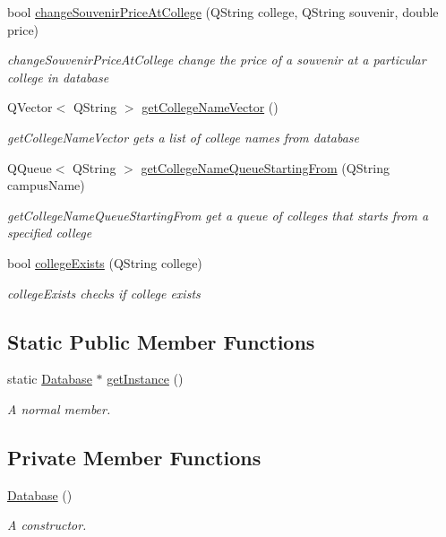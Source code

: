 \begin{DoxyCompactItemize}
bool \hyperlink{class_database_acf6e65da15d6219c2de6d8f5515cb6da}{change\+Souvenir\+Price\+At\+College} (Q\+String college, Q\+String souvenir, double price)
\begin{DoxyCompactList}\small\item\em change\+Souvenir\+Price\+At\+College change the price of a souvenir at a particular college in database \end{DoxyCompactList}\item 
Q\+Vector$<$ Q\+String $>$ \hyperlink{class_database_a745e0e7d8279c576cd3672ba2f6375e1}{get\+College\+Name\+Vector} ()
\begin{DoxyCompactList}\small\item\em get\+College\+Name\+Vector gets a list of college names from database \end{DoxyCompactList}\item 
Q\+Queue$<$ Q\+String $>$ \hyperlink{class_database_a716dc593105e4e15cd7e0834d4d1d82a}{get\+College\+Name\+Queue\+Starting\+From} (Q\+String campus\+Name)
\begin{DoxyCompactList}\small\item\em get\+College\+Name\+Queue\+Starting\+From get a queue of colleges that starts from a specified college \end{DoxyCompactList}\item 
bool \hyperlink{class_database_a22d8c0fe6680a2dec485997863015a41}{college\+Exists} (Q\+String college)
\begin{DoxyCompactList}\small\item\em college\+Exists checks if college exists \end{DoxyCompactList}\end{DoxyCompactItemize}
\subsection*{Static Public Member Functions}
\begin{DoxyCompactItemize}
\item 
static \hyperlink{class_database}{Database} $\ast$ \hyperlink{class_database_a71e30b03e228b01f1460c73e770e3e49}{get\+Instance} ()
\begin{DoxyCompactList}\small\item\em A normal member. \end{DoxyCompactList}\end{DoxyCompactItemize}
\subsection*{Private Member Functions}
\begin{DoxyCompactItemize}
\item 
\hyperlink{class_database_a4703c80e6969d33565ea340f768fdadf}{Database} ()
\begin{DoxyCompactList}\small\item\em A constructor. \end{DoxyCompactList}\end{DoxyCompactItemize}
